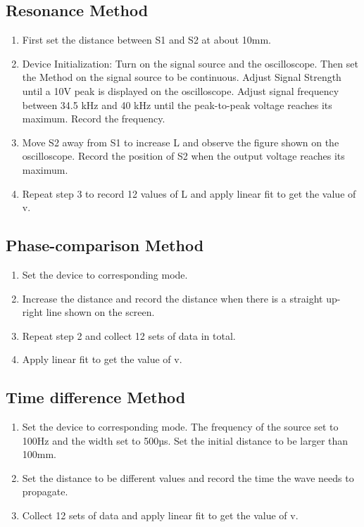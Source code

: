 \documentclass[12pt,a4paper]{article}
\begin{document}
\subsection{Resonance Method}
\begin{enumerate}
    \item First set the distance between S1 and S2 at about 10mm.
    \item  Device Initialization: Turn on the signal source and the oscilloscope. Then set the Method on the signal source to be continuous. Adjust Signal Strength until a 10V peak is displayed on the oscilloscope. Adjust signal frequency between 34.5 kHz and 40 kHz until the peak-to-peak voltage reaches its maximum. Record the frequency.
    \item Move S2 away from S1 to increase L and observe the figure shown on the oscilloscope. Record the position of S2 when the output voltage reaches its maximum.
    \item Repeat step 3 to record 12 values of L and apply linear fit to get the value of v.
\end{enumerate}

\subsection{Phase-comparison Method}
\begin{enumerate}
    \item Set the device to corresponding mode. 
    \item Increase the distance and record the distance when there is a straight up-right line shown on the screen.
    \item Repeat step 2 and collect 12 sets of data in total.
    \item Apply linear fit to get the value of v.
\end{enumerate}

\subsection{Time difference Method} 
\begin{enumerate}
    \item Set the device to corresponding mode. The frequency of the source set to 100Hz and the width set to 500µs. Set the initial distance to be larger than 100mm.
    \item Set the distance to be different values and record the time the wave needs to propagate.
    \item Collect 12 sets of data and apply linear fit to get the value of v.
\end{enumerate}
\end{document}
